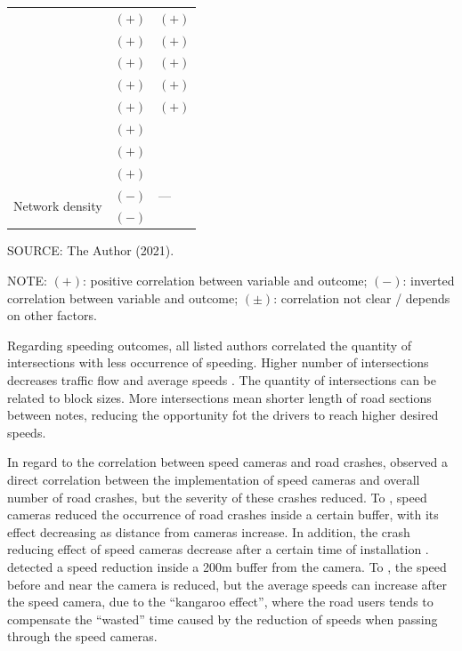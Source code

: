 \begin{table}[!hbtp]
\begin{tabular}{p{2.5cm}p{6.2cm}p{6.2cm}}
         & $(+)$ \textcite{Dumbaugh2011} & $(+)$ \textcite{Dumbaugh2013} \\
         & $(+)$ \textcite{Dumbaugh2013} & $(+)$ \textcite{Ewing2009} \\
         & $(+)$ \textcite{Ewing2009} & $(+)$ \textcite{Huang2018} \\
         & $(+)$ \textcite{Huang2018} & $(+)$ \textcite{Obelheiro2020} \\
         & $(+)$ \textcite{Obelheiro2020} & $(+)$ \textcite{Welle2016} \\
         & $(+)$ \textcite{Ukkusuri2012} &  \\
         & $(+)$ \textcite{Welle2016} &  \\
         & $(+)$ \textcite{Yu2017} &  \\ \hline
        \multirow{2}{2cm}{Network density} & $(-)$ \textcite{Marshall2010} & --- \\
         & $(-)$ \textcite{Marshall2011} &  \\ \hline
        \end{tabular}
    \label{tab:design}
    \par \vspace{1mm} \footnotesize \raggedright
    SOURCE: The Author (2021).
    \par \vspace{1mm} \footnotesize \raggedright
    NOTE: $(+)$: positive correlation between variable and outcome; $(-)$: inverted correlation between variable and outcome; $(\pm)$: correlation not clear / depends on other factors.
\end{table}

Regarding speeding outcomes, all listed authors correlated the quantity of intersections with less occurrence of speeding. Higher number of intersections decreases traffic flow and average speeds \cite{Elvik2009,Ewing2009}. The quantity of intersections can be related to block sizes. More intersections mean shorter length of road sections between notes, reducing the opportunity fot the drivers to reach higher desired speeds.

In regard to the correlation between speed cameras and road crashes, \textcite{Park2019} observed a direct correlation between the implementation of speed cameras and overall number of road crashes, but the severity of these crashes reduced. To \textcite{Høye2015,Li2013a}, speed cameras reduced the occurrence of road crashes inside a certain buffer, with its effect decreasing as distance from cameras increase. In addition, the crash reducing effect of speed cameras decrease after a certain time of installation \cite{Li2020}. \textcite{Li2013a,Oliveira2015} detected a speed reduction inside a 200m buffer from the camera. To \textcite{Li2020}, the speed before and near the camera is reduced, but the average speeds can increase after the speed camera, due to the ``kangaroo effect'', where the road users tends to compensate the ``wasted'' time caused by the reduction of speeds when passing through the speed cameras. 

